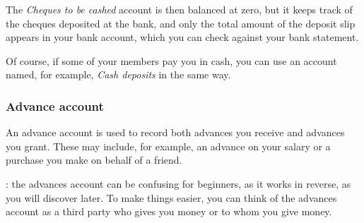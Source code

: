 The \emph{Cheques to be cashed} account is then balanced at zero, but it keeps track of the cheques deposited at the bank, and only the total amount of the deposit slip appears in your bank account, which you can check against your bank statement.

Of course, if some of your members pay you in cash, you can use an account named, for example, \emph{Cash deposits} in the same way.


\subsubsection{Advance account\label{accounts-type-bank-advance}}

An advance account is used to record both advances you receive and advances you grant. These may include, for example, an advance on your salary or a purchase you make on behalf of a friend.

\Note{}: the advances account can be confusing for beginners, as it works in reverse, as you will discover later. To make things easier, you can think of the advances account as a third party who gives you money or to whom you give money.


